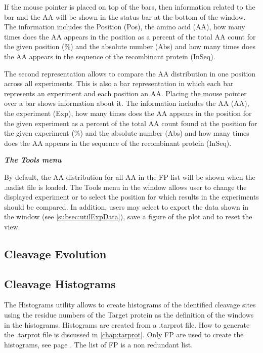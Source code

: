 If the mouse pointer is placed on top of the bars, then information related to the bar and the AA will be shown in the status bar at the bottom of the window. The information includes the Position (Pos), the amino acid (AA), how many times does the AA appears in the position as a percent of the total AA count for the given position (\%) and the absolute number (Abs) and how many times does the AA appears in the sequence of the recombinant protein (InSeq).

The second representation allows to compare the AA distribution in one position across all experiments. This is also a bar representation in which each bar represents an experiment and each position an AA. Placing the mouse pointer over a bar shows information about it. The information includes the AA (AA), the experiment (Exp), how many times does the AA appears in the position for the given experiment as a percent of the total AA count found at the position for the given experiment (\%) and  the absolute number (Abs) and how many times does the AA appears in the sequence of the recombinant protein (InSeq).

\textit{\textbf{The Tools menu}}

By default, the AA distribution for all AA in the FP list will be shown when the .aadist file is loaded. The Tools menu in the window allows user to change the displayed experiment or to select the position for which results in the experiments should be compared. In addition, users may select to export the data shown in the window (see \autoref{subsec:utilExpData}), save a figure of the plot and to reset the view. 

\subsection{Cleavage Evolution}

\subsection{Cleavage Histograms}
\label{subsec:utilHistoCut}
The Histograms utility allows to create histograms of the identified cleavage sites using the residue numbers of the Target protein as the definition of the windows in the histograms. Histograms are created from a .tarprot file. How to generate the .tarprot file is discussed in \autoref{chap:tarprot}. Only FP are used to create the histograms, see page \pageref{par:tarprotPIP}. The list of FP is a non redundant list. 


